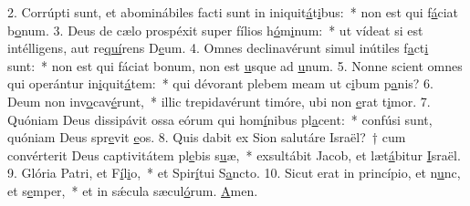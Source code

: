 2. Corrúpti sunt, et abominábiles facti sunt in iniquit\uline{á}t\uline{i}bus:~* non est qui f\uline{á}ciat b\uline{o}num.
3. Deus de cælo prospéxit super fílios h\uline{ó}m\uline{i}num:~* ut vídeat si est intélligens, aut re\uline{quí}rens D\uline{e}um.
4. Omnes declinavérunt simul inútiles f\uline{a}ct\uline{i} sunt:~* non est qui fáciat bonum, non est \uline{u}sque ad \uline{u}num.
5. Nonne scient omnes qui operántur in\uline{i}quit\uline{á}tem:~* qui dévorant plebem meam ut c\uline{i}bum p\uline{a}nis?
6. Deum non inv\uline{o}cav\uline{é}runt,~* illic trepidavérunt timóre, ubi non \uline{e}rat t\uline{i}mor.
7. Quóniam Deus dissipávit ossa eórum qui hom\uline{í}nibus pl\uline{a}cent:~* confúsi sunt, quóniam Deus spr\uline{e}vit \uline{e}os.
8. Quis dabit ex Sion salutáre Israël?~† cum convérterit Deus captivitátem pl\uline{e}bis s\uline{u}æ,~* exsultábit Jacob, et læt\uline{á}bitur \uline{I}sraël.
9. Glória Patri, et F\uline{í}l\uline{i}o,~* et Spir\uline{í}tui S\uline{a}ncto.
10. Sicut erat in princípio, et n\uline{u}nc, et s\uline{e}mper,~* et in sǽcula sæcul\uline{ó}rum. \uline{A}men.

